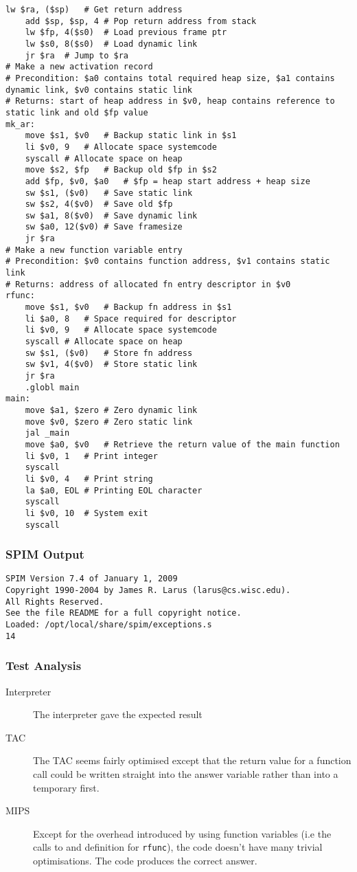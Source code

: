 \begin{lstlisting}[showstringspaces=false,breaklines=true,backgroundcolor=\color{light-gray}, captionpos=b]
	lw $ra, ($sp)	# Get return address
	add $sp, $sp, 4	# Pop return address from stack
	lw $fp, 4($s0)	# Load previous frame ptr
	lw $s0, 8($s0)	# Load dynamic link
	jr $ra	# Jump to $ra
# Make a new activation record
# Precondition: $a0 contains total required heap size, $a1 contains dynamic link, $v0 contains static link
# Returns: start of heap address in $v0, heap contains reference to static link and old $fp value
mk_ar:
	move $s1, $v0	# Backup static link in $s1
	li $v0, 9	# Allocate space systemcode
	syscall	# Allocate space on heap
	move $s2, $fp	# Backup old $fp in $s2
	add $fp, $v0, $a0	# $fp = heap start address + heap size
	sw $s1, ($v0)	# Save static link
	sw $s2, 4($v0)	# Save old $fp
	sw $a1, 8($v0)	# Save dynamic link
	sw $a0, 12($v0)	# Save framesize
	jr $ra
# Make a new function variable entry
# Precondition: $v0 contains function address, $v1 contains static link
# Returns: address of allocated fn entry descriptor in $v0
rfunc:
	move $s1, $v0	# Backup fn address in $s1
	li $a0, 8	# Space required for descriptor
	li $v0, 9	# Allocate space systemcode
	syscall	# Allocate space on heap
	sw $s1, ($v0)	# Store fn address
	sw $v1, 4($v0)	# Store static link
	jr $ra
	.globl main
main:
	move $a1, $zero	# Zero dynamic link
	move $v0, $zero	# Zero static link
	jal _main
	move $a0, $v0	# Retrieve the return value of the main function
	li $v0, 1	# Print integer
	syscall
	li $v0, 4	# Print string
	la $a0, EOL	# Printing EOL character
	syscall
	li $v0, 10	# System exit
	syscall

\end{lstlisting}\subsubsection{SPIM Output}
\begin{verbatim}
SPIM Version 7.4 of January 1, 2009
Copyright 1990-2004 by James R. Larus (larus@cs.wisc.edu).
All Rights Reserved.
See the file README for a full copyright notice.
Loaded: /opt/local/share/spim/exceptions.s
14
\end{verbatim}
\subsubsection{Test Analysis}
\begin{description}
	\item[Interpreter] The interpreter gave the expected result
	\item[TAC] The TAC seems fairly optimised except that the return value for a function call could be written straight into the answer variable rather than into a temporary first.
	\item[MIPS] Except for the overhead introduced by using function variables (i.e the calls to and definition for \verb!rfunc!), the code doesn't have many trivial optimisations. The code produces the correct answer.
\end{description}

